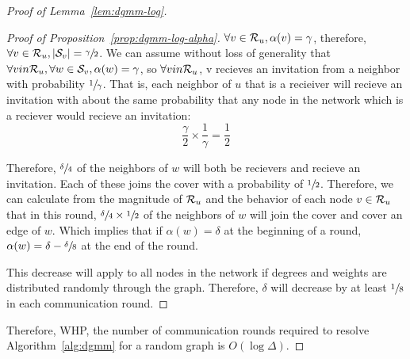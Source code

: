 \begin{proof}[Proof of Lemma~\ref{lem:dgmm-log}]
\begin{proof}[Proof of Proposition~\ref{prop:dgmm-log-alpha}]
$\forall v \in {\mathcal R}_u, \alpha(v) = \gamma$, therefore, $\forall v \in {\mathcal R}_u, |{\mathcal S}_v| = \sfrac{\gamma}{2}$. We can assume without loss of generality that $\forall v in {\mathcal R}_u, \forall w \in {\mathcal S}_v, \alpha(w) = \gamma$, so $\forall v in {\mathcal R}_u$, v recieves an invitation from a neighbor with probability $\sfrac{1}{\gamma}$. That is, each neighbor of $u$ that is a recieiver will recieve an invitation with about the same probability that any node in the network which is a reciever would recieve an invitation:\begin{equation*}\frac{\gamma}{2} \times \frac{1}{\gamma} = \frac{1}{2}\end{equation*}

Therefore, $\sfrac{\delta}{4}$ of the neighbors of $w$ will both be recievers and recieve an invitation. Each of these joins the cover with a probability of $\sfrac{1}{2}$. Therefore, we can calculate from the magnitude of ${\mathcal R}_u$ and the behavior of each node $v \in {\mathcal R}_u$ that in this round, $\sfrac{\delta}{4}\times \sfrac{1}{2}$ of the neighbors of $w$ will join the cover and cover an edge of $w$. Which implies that if $\alpha(w) = \delta$ at the beginning of a round, $\alpha(w) = \delta-\sfrac{\delta}{8}$ at the end of the round.

This decrease will apply to all nodes in the network if degrees and weights are distributed randomly through the graph. Therefore, $\delta$ will decrease by at least $\sfrac{1}{8}$ in each communication round. 
\end{proof}

Therefore, WHP, the number of communication rounds required to resolve Algorithm~\ref{alg:dgmm} for a random graph is $O(\log\Delta)$.

\end{proof} 

